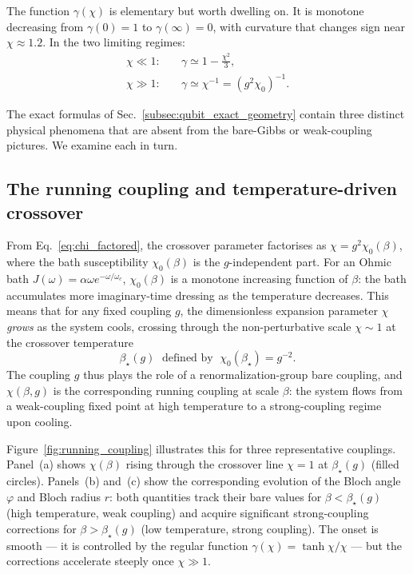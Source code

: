 The function $\gamma(\chi)$ is elementary but worth dwelling on.  It is
monotone decreasing from $\gamma(0)=1$ to $\gamma(\infty)=0$, with curvature
that changes sign near $\chi\approx 1.2$.  In the two limiting regimes:
\begin{align}
  \chi \ll 1:\quad & \gamma \simeq 1 - \tfrac{\chi^2}{3},
  \label{eq:gamma_weak}\\
  \chi \gg 1:\quad & \gamma \simeq \chi^{-1} = (g^2\chi_0)^{-1}.
  \label{eq:gamma_strong}
\end{align}

The exact formulas of Sec.~\ref{subsec:qubit_exact_geometry} contain three
distinct physical phenomena that are absent from the bare-Gibbs or
weak-coupling pictures.  We examine each in turn.

\subsection{The running coupling and temperature-driven crossover}
\label{subsec:running_coupling}

From Eq.~\eqref{eq:chi_factored}, the crossover parameter factorises as
$\chi = g^2\chi_0(\beta)$, where the bath susceptibility $\chi_0(\beta)$ is
the $g$-independent part.  For an Ohmic bath $J(\omega) = \alpha\omega
e^{-\omega/\omega_c}$, $\chi_0(\beta)$ is a monotone increasing function of
$\beta$: the bath accumulates more imaginary-time dressing as the temperature
decreases.  This means that for any fixed coupling $g$, the dimensionless
expansion parameter $\chi$ \emph{grows} as the system cools, crossing through
the non-perturbative scale $\chi\sim 1$ at the crossover temperature
\begin{equation}
    \beta_\star(g) \;\text{ defined by }\; \chi_0(\beta_\star) = g^{-2}.
\end{equation}
The coupling $g$ thus plays the role of a renormalization-group bare coupling,
and $\chi(\beta,g)$ is the corresponding running coupling at scale $\beta$: the
system flows from a weak-coupling fixed point at high temperature to a
strong-coupling regime upon cooling.

Figure~\ref{fig:running_coupling} illustrates this for three representative
couplings.  Panel~(a) shows $\chi(\beta)$ rising through the crossover line
$\chi=1$ at $\beta_\star(g)$ (filled circles).  Panels~(b) and~(c) show the
corresponding evolution of the Bloch angle $\varphi$ and Bloch radius $r$: both
quantities track their bare values for $\beta < \beta_\star(g)$ (high temperature,
weak coupling) and acquire significant strong-coupling corrections for
$\beta > \beta_\star(g)$ (low temperature, strong coupling).  The onset is smooth
--- it is controlled by the regular function $\gamma(\chi) = \tanh\chi/\chi$ ---
but the corrections accelerate steeply once $\chi \gg 1$.

